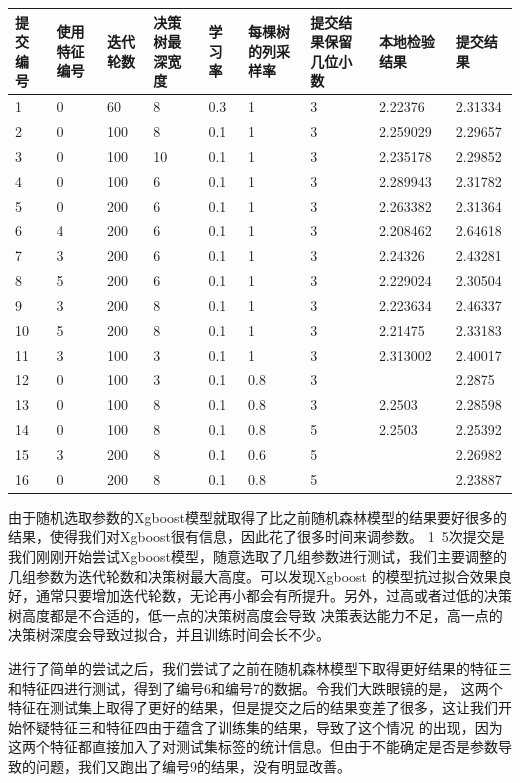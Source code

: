 \begin{tabular}{|p{0.4cm}|p{0.4cm}|p{0.4cm}|p{0.4cm}|p{0.4cm}|p{0.4cm}|p{0.4cm}|p{1.2cm}|p{1.2cm}|}
\hline
提交编号 & 使用特征编号 & 迭代轮数 & 决策树最深宽度 & 学习率 & 每棵树的列采样率 & 提交结果保留几位小数 & 本地检验结果 & 提交结果 \\
\hline
1 & 0 & 60 & 8 & 0.3 & 1 & 3 & 2.22376 & 2.31334 \\
\hline
2 & 0 & 100 & 8 & 0.1 & 1 & 3 & 2.259029 & 2.29657 \\
\hline
3 & 0 & 100 & 10 & 0.1 & 1 & 3 & 2.235178 & 2.29852 \\
\hline
4 & 0 & 100 & 6 & 0.1 & 1 & 3 & 2.289943 & 2.31782 \\
\hline
5 & 0 & 200 & 6 & 0.1 & 1 & 3 & 2.263382 & 2.31364 \\
\hline
6 & 4 & 200 & 6 & 0.1 & 1 & 3 & 2.208462 & 2.64618 \\
\hline
7 & 3 & 200 & 6 & 0.1 & 1 & 3 & 2.24326 & 2.43281 \\
\hline
8 & 5 & 200 & 6 & 0.1 & 1 & 3 & 2.229024 & 2.30504 \\
\hline
9 & 3 & 200 & 8 & 0.1 & 1 & 3 & 2.223634 & 2.46337 \\
\hline
10 & 5 & 200 & 8 & 0.1 & 1 & 3 & 2.21475 & 2.33183 \\
\hline
11 & 3 & 100 & 3 & 0.1 & 1 & 3 & 2.313002 & 2.40017 \\
\hline
12 & 0 & 100 & 3 & 0.1 & 0.8 & 3 &  & 2.2875 \\
\hline
13 & 0 & 100 & 8 & 0.1 & 0.8 & 3 & 2.2503 & 2.28598 \\
\hline
14 & 0 & 100 & 8 & 0.1 & 0.8 & 5 & 2.2503 & 2.25392 \\
\hline
15 & 3 & 200 & 8 & 0.1 & 0.6 & 5 &  & 2.26982 \\
\hline
16 & 0 & 200 & 8 & 0.1 & 0.8 & 5 &  & 2.23887 \\
\hline
\end{tabular}

由于随机选取参数的Xgboost模型就取得了比之前随机森林模型的结果要好很多的结果，使得我们对Xgboost很有信息，因此花了很多时间来调参数。
1~5次提交是我们刚刚开始尝试Xgboost模型，随意选取了几组参数进行测试，我们主要调整的几组参数为迭代轮数和决策树最大高度。可以发现Xgboost
的模型抗过拟合效果良好，通常只要增加迭代轮数，无论再小都会有所提升。另外，过高或者过低的决策树高度都是不合适的，低一点的决策树高度会导致
决策表达能力不足，高一点的决策树深度会导致过拟合，并且训练时间会长不少。

进行了简单的尝试之后，我们尝试了之前在随机森林模型下取得更好结果的特征三和特征四进行测试，得到了编号6和编号7的数据。令我们大跌眼镜的是，
这两个特征在测试集上取得了更好的结果，但是提交之后的结果变差了很多，这让我们开始怀疑特征三和特征四由于蕴含了训练集的结果，导致了这个情况
的出现，因为这两个特征都直接加入了对测试集标签的统计信息。但由于不能确定是否是参数导致的问题，我们又跑出了编号9的结果，没有明显改善。

